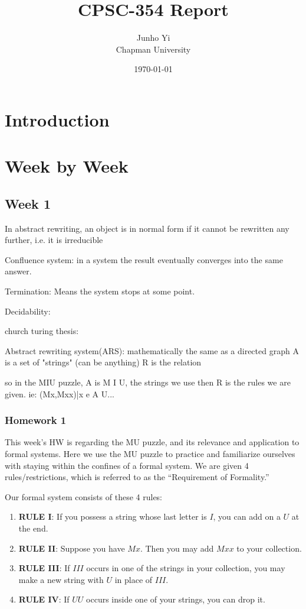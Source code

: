 \documentclass{article}
\title{CPSC-354 Report}
\author{Junho Yi  \\ Chapman University}
\date{\today}
\theoremstyle{theorem}
\theoremstyle{definition}
\theoremstyle{remark}
\begin{document}
\maketitle

\begin{abstract}
\end{abstract}

\setcounter{tocdepth}{3}
\tableofcontents

\section{Introduction}\label{intro}

\section{Week by Week}\label{homework}

\subsection{Week 1}

In abstract rewriting, an object is in normal form if it cannot be rewritten any further, i.e. it is irreducible

Confluence system: in a system the result eventually converges into the same answer.

Termination: Means the system stops at some point. 

Decidability: 

church turing thesis:

Abstract rewriting system(ARS): mathematically the same as a directed graph
A is a set of "strings" (can be anything)
R is the relation

so in the MIU puzzle, A is M I U, the strings we use
then R is the rules we are given. ie: {(Mx,Mxx)|x e A} U...

\subsubsection{Homework 1}

This week's HW is regarding the MU puzzle, and its relevance and application to formal systems. Here we use the MU puzzle to practice and familiarize ourselves with staying within the confines of a formal system. We are given 4 rules/restrictions, which is referred to as the ``Requirement of Formality.'' 

Our formal system consists of these 4 rules:
\begin{enumerate}
    \item \textbf{RULE I}: If you possess a string whose last letter is $I$, you can add on a $U$ at the end. 
    \item \textbf{RULE II}: Suppose you have $Mx$. Then you may add $Mxx$ to your collection. 
    \item \textbf{RULE III}: If $III$ occurs in one of the strings in your collection, you may make a new string with $U$ in place of $III$.
    \item \textbf{RULE IV}: If $UU$ occurs inside one of your strings, you can drop it. 
\end{enumerate}
\end{document}
